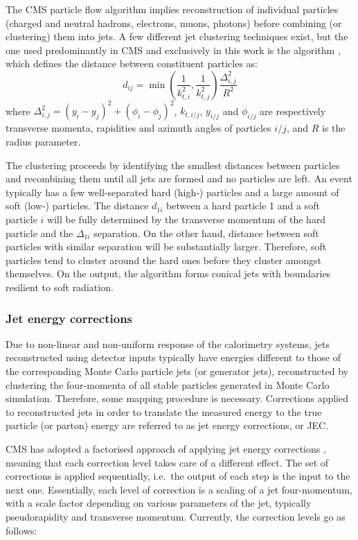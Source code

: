 The CMS particle flow algorithm implies reconstruction of individual particles (charged and neutral hadrons, electrons,
muons, photons) before combining (or clustering) them into jets. A few different jet clustering techniques exist, but
the one used predominantly in CMS and exclusively in this work is the \antikt algorithm \autocite{anti-kt}, which
defines the distance between constituent particles as:
\begin{equation}
d_{ij} = \min\left(\frac{1}{k^2_{t,i}},\frac{1}{k^2_{t,j}}\right) \frac{\Delta_{i,j}^2}{R^2}
\end{equation}
where $\Delta_{i,j}^2 = (y_i-y_j)^2 + (\phi_i-\phi_j)^2$, $k_{t,i/j}$, $y_{i/j}$ and $\phi_{i/j}$ are respectively
transverse momenta, rapidities and azimuth angles of particles $i/j$, and $R$ is the radius parameter.

The clustering proceeds by identifying the smallest distances between particles and recombining them until all jets are
formed and no particles are left. An event typically has a few well-separated hard (high-\pt) particles and a large
amount of soft (low-\pt) particles. The distance $d_{1i}$ between a hard particle 1 and a soft particle $i$ will be
fully determined by the transverse momentum of the hard particle and the $\Delta_{1i}$ separation. On the other hand,
distance between soft particles with similar separation will be substantially larger. Therefore, soft particles tend to
cluster around the hard ones before they cluster amongst themselves. On the output, the \antikt algorithm forms
conical jets with boundaries resilient to soft radiation.

\subsubsection{Jet energy corrections}
\label{sss:JEC}

Due to non-linear and non-uniform response of the calorimetry systems, jets reconstructed using detector inputs
typically have energies different to those of the corresponding Monte Carlo particle jets (or generator jets),
reconstructed by clustering the four-momenta of all stable particles generated in Monte Carlo simulation. Therefore,
some mapping procedure is necessary. Corrections applied to reconstructed jets in order to translate the measured energy
to the true particle (or parton) energy are referred to as jet energy corrections, or JEC.

CMS has adopted a factorised approach of applying jet energy corrections \autocite{JEC_CMS}, meaning that each
correction level takes care of a different effect. The set of corrections is applied sequentially, i.e.\ the output of
each step is the input to the next one. Essentially, each level of correction is a scaling of a jet four-momentum, with
a scale factor depending on various parameters of the jet, typically pseudorapidity and transverse momentum. Currently,
the correction levels go as follows:


